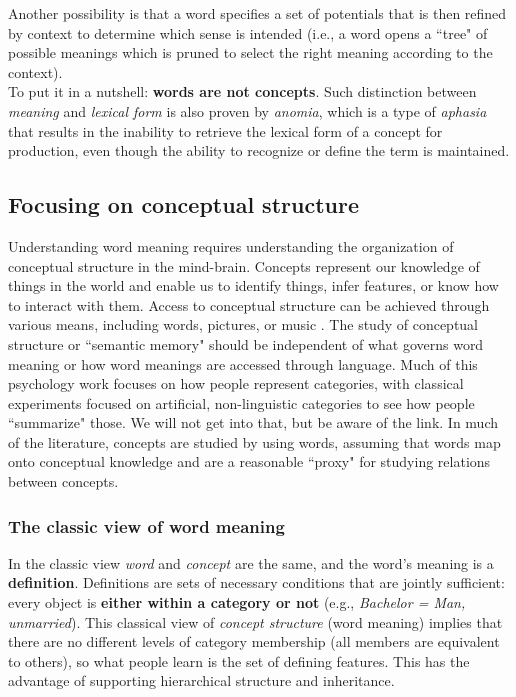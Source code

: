Another possibility is that a word specifies a set of potentials that is then refined by context to determine which sense is intended (i.e., a word opens a ``tree" of possible meanings which is pruned to select the right meaning according to the context).\\

To put it in a nutshell: \textbf{words are not concepts}. Such distinction between \textit{meaning} and \textit{lexical form} is also proven by \textit{anomia}, which is a type of \textit{aphasia} that results in the inability to retrieve the lexical form of a concept for production, even though the ability to recognize or define the term is maintained.

\subsection{Focusing on conceptual structure}
Understanding word meaning requires understanding the organization of conceptual structure in the mind-brain. Concepts represent our knowledge of things in the world and enable us to identify things, infer features, or know how to interact with them. Access to conceptual structure can be achieved through various means, including words, pictures, or music \notet. The study of conceptual structure or ``semantic memory" should be independent of what governs word meaning or how word meanings are accessed through language. Much of this psychology work focuses on how people represent categories, with classical experiments focused on artificial, non-linguistic categories to see how people ``summarize" those. We will not get into that, but be aware of the link.
In much of the literature, concepts are studied by using words, assuming that words map onto conceptual knowledge and are a reasonable ``proxy" for studying relations between concepts.


\subsubsection{The classic view of word meaning}
In the classic view \textit{word} and \textit{concept} are the same, and the word's meaning is a \textbf{definition}. Definitions are sets of necessary conditions that are jointly sufficient: every object is \textbf{either within a category or not} (e.g., \textit{Bachelor = Man, unmarried}).
This classical view of \textit{concept structure} (word meaning) implies that there are no different levels of category membership (all members are equivalent to others), so what people learn is the set of defining features. This has the advantage of supporting hierarchical structure and inheritance.


